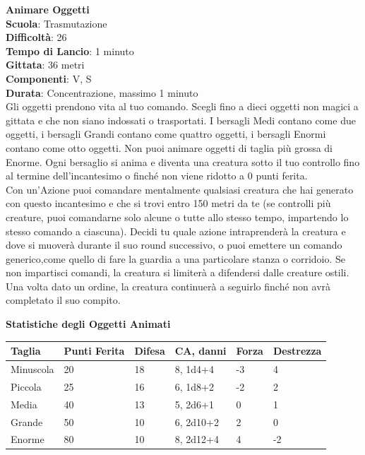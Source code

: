 \begin{multicols}{2}
\medskip\textbf{Animare Oggetti}\\
\textbf{Scuola}: Trasmutazione\\
\textbf{Difficoltà}: 26\\
\textbf{Tempo di Lancio}: 1 minuto\\
\textbf{Gittata}: 36 metri\\
\textbf{Componenti}: V, S\\
\textbf{Durata}: Concentrazione, massimo 1 minuto\\
Gli oggetti prendono vita al tuo comando. Scegli fino a dieci oggetti non magici a gittata e che non siano indossati o trasportati. I bersagli Medi contano come due oggetti, i bersagli Grandi contano come quattro oggetti, i bersagli Enormi contano come otto oggetti. Non puoi animare oggetti di taglia più grossa di Enorme. Ogni bersaglio si anima e diventa una creatura sotto il tuo controllo fino al termine dell'incantesimo o finché non viene ridotto a 0 punti ferita.\\
Con un'Azione puoi comandare mentalmente qualsiasi creatura che hai generato con questo incantesimo e che si trovi entro 150 metri da te (se controlli più creature, puoi comandarne solo alcune o tutte allo stesso tempo, impartendo lo stesso comando a ciascuna). Decidi tu quale azione intraprenderà la creatura e dove si muoverà durante il suo round successivo, o puoi emettere un comando generico,come quello di fare la guardia a una particolare stanza o corridoio. Se non impartisci comandi, la creatura si limiterà a difendersi dalle creature ostili. Una volta dato un ordine, la creatura continuerà a seguirlo finché non avrà completato il suo compito.
\bigskip

\end{multicols}

\textbf{Statistiche degli Oggetti Animati}
\bigskip

\begin{tabular}{llllll}
Taglia		&Punti Ferita	&Difesa	&CA, danni					&Forza	&Destrezza\\ 
\toprule
Minuscola 	&20 			&18		&8, {1d4+4} 	&-3 		&4\\
Piccola 	&25 			&16 	&6, {1d8+2} 	&-2 		&2\\
Media 		&40 			&13 	&5, {2d6+1} 	&0 			&1\\
Grande 		&50 			&10 	&6, {2d10+2}	&2 			&0\\
Enorme 		&80 			&10 	&8, {2d12+4}	&4 			&-2\\
\end{tabular}

